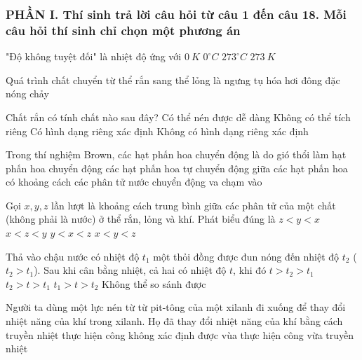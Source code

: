 \subsubsection*{PHẦN I. Thí sinh trả lời câu hỏi từ câu 1 đến câu 18. Mỗi câu hỏi thí sinh chỉ chọn một phương án}
\setcounter{ex}{0}
\begin{ex} %
	"Độ không tuyệt đối" là nhiệt độ ứng với
	\choice
	{\True $0\ K$}
	{$0^\circ C$}
	{$273^\circ C$}
	{$273\ K$}
	\loigiai{}
\end{ex}

\begin{ex} %
	Quá trình chất chuyển từ thể rắn sang thể lỏng là
	\choice
	{ngưng tụ}
	{hóa hơi}
	{đông đặc}
	{\True nóng chảy}
	\loigiai{}
\end{ex}

\begin{ex} %
	Chất rắn có tính chất nào sau đây?
	\choice
	{Có thể nén được dễ dàng}
	{Không có thể tích riêng}
	{\True Có hình dạng riêng xác định}
	{Không có hình dạng riêng xác định}
	\loigiai{}
\end{ex}

\begin{ex} %
	Trong thí nghiệm Brown, các hạt phấn hoa chuyển động là do
	\choice
	{gió thổi làm hạt phấn hoa chuyển động}
	{các hạt phấn hoa tự chuyển động}
	{giữa các hạt phấn hoa có khoảng cách}
	{\True các phân tử nước chuyển động va chạm vào}
	\loigiai{}
\end{ex}

\begin{ex} %
	Gọi $x, y, z$ lần lượt là khoảng cách trung bình giữa các phân tử của một chất (không phải là nước) ở thể rắn, lỏng và khí. Phát biểu đúng là
	\choice
	{$z<y<x$}
	{$x<z<y$}
	{$y<x<z$}
	{\True $x<y<z$}
	\loigiai{}
\end{ex}

\begin{ex} %
	Thả vào chậu nước có nhiệt độ $t_1$ một thỏi đồng được đun nóng đến nhiệt độ $t_2$ ($t_2>t_1$). Sau khi cân bằng nhiệt, cả hai có nhiệt độ $t$, khi đó
	\choice
	{$t>t_2>t_1$}
	{\True $t_2>t>t_1$}
	{$t_1>t>t_2$}
	{Không thể so sánh được}
	\loigiai{}
\end{ex}

\begin{ex} %
	Người ta dùng một lực nén từ từ pit-tông của một xilanh đi xuống để thay đổi nhiệt năng của khí trong xilanh. Họ đã thay đổi nhiệt năng của khí bằng cách
	\choice
	{truyền nhiệt}
	{\True thực hiện công}
	{không xác định được}
	{vùa thực hiện công vừa truyền nhiệt}
	\loigiai{}
\end{ex}

